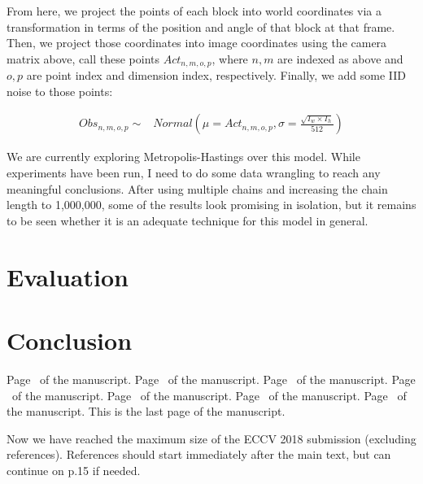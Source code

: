 \documentclass[runningheads]{llncs}
\begin{document}
From here, we project the points of each block into world coordinates via a 
transformation in terms of the position and angle of that block at that 
frame. Then, we project those coordinates into image coordinates using the 
camera matrix above, call these points $Act_{n,m,o,p}$, where $n, m$ are 
indexed as above and $o, p$ are point index and dimension 
index, respectively. Finally, we add some IID noise to those points:

\begin{align*}
    Obs_{n,m,o,p} \sim& Normal(\mu=Act_{n,m,o,p},\sigma=\frac{\sqrt{I_w \times I_h}}{512})
\end{align*}

We are currently exploring Metropolis-Hastings over this model. While experiments 
have been run, I need to do some data wrangling to reach any meaningful 
conclusions. After using multiple chains and increasing the chain length to 
1,000,000, some of the results look promising in isolation, but it remains to be 
seen whether it is an adequate technique for this model in general.

\section{Evaluation}

\section{Conclusion}

\clearpage\mbox{}Page \thepage\ of the manuscript.
\clearpage\mbox{}Page \thepage\ of the manuscript.
\clearpage\mbox{}Page \thepage\ of the manuscript.
\clearpage\mbox{}Page \thepage\ of the manuscript.
\clearpage\mbox{}Page \thepage\ of the manuscript.
\clearpage\mbox{}Page \thepage\ of the manuscript.
\clearpage\mbox{}Page \thepage\ of the manuscript.
This is the last page of the manuscript.
\par\vfill\par
Now we have reached the maximum size of the ECCV 2018 submission (excluding references).
References should start immediately after the main text, but can continue on p.15 if needed.

\clearpage



\end{document}

